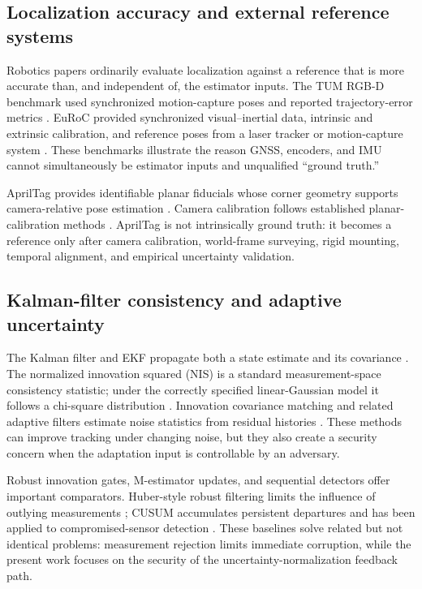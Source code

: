 \documentclass[11pt,a4paper]{article}
\begin{document}
\subsection{Localization accuracy and external reference systems}

Robotics papers ordinarily evaluate localization against a reference that is
more accurate than, and independent of, the estimator inputs. The TUM RGB-D
benchmark used synchronized motion-capture poses and reported trajectory-error
metrics \cite{sturm2012tum}. EuRoC provided synchronized visual--inertial data,
intrinsic and extrinsic calibration, and reference poses from a laser tracker
or motion-capture system \cite{burri2016euroc}. These benchmarks illustrate the
reason GNSS, encoders, and IMU cannot simultaneously be estimator inputs and
unqualified ``ground truth.''

AprilTag provides identifiable planar fiducials whose corner geometry supports
camera-relative pose estimation \cite{olson2011apriltag,wang2016apriltag2}.
Camera calibration follows established planar-calibration methods
\cite{zhang2000calibration}. AprilTag is not intrinsically ground truth: it
becomes a reference only after camera calibration, world-frame surveying,
rigid mounting, temporal alignment, and empirical uncertainty validation.

\subsection{Kalman-filter consistency and adaptive uncertainty}

The Kalman filter and EKF propagate both a state estimate and its covariance
\cite{kalman1960,jazwinski1970}. The normalized innovation squared (NIS) is a
standard measurement-space consistency statistic; under the correctly
specified linear-Gaussian model it follows a chi-square distribution
\cite{barshalom2001}. Innovation covariance matching and related adaptive
filters estimate noise statistics from residual histories
\cite{mehra1970,akhlaghi2017}. These methods can improve tracking under
changing noise, but they also create a security concern when the adaptation
input is controllable by an adversary.

Robust innovation gates, M-estimator updates, and sequential detectors offer
important comparators. Huber-style robust filtering limits the influence of
outlying measurements \cite{gandhi2010}; CUSUM accumulates persistent
departures and has been applied to compromised-sensor detection
\cite{murguia2016}. These baselines solve related but not identical problems:
measurement rejection limits immediate corruption, while the present work
focuses on the security of the uncertainty-normalization feedback path.
\end{document}
